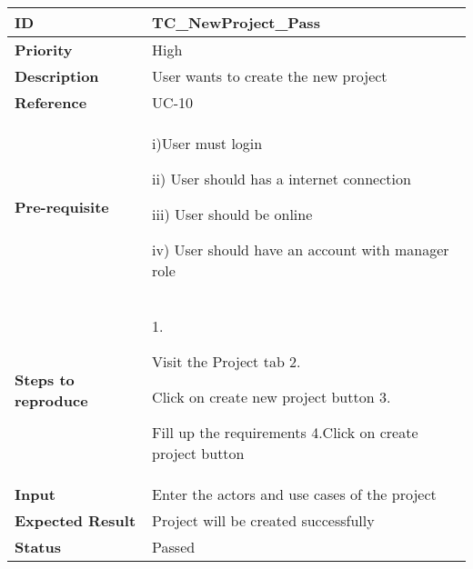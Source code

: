 \begin{center}
    \begin{tabularx}{\textwidth}{|l|X|}
        \hline
        \textbf{ID}                 & TC\_NewProject\_Pass                          \\
        \hline
        \textbf{Priority}           & High                                          \\
        \hline
        \textbf{Description}        & User wants to create the new project          \\
        \hline
        \textbf{Reference}          & UC-10                                         \\
        \hline
        \textbf{Pre-requisite}      & i)User must login

        ii) User should has a internet connection

        iii) User should be online

        iv) User should have an account with manager role                           \\
        \hline
        \textbf{Steps to reproduce} & 1.

        Visit the Project tab 2.

        Click on create new project button 3.

        Fill up the requirements 4.Click on create project button                   \\
        \hline
        \textbf{Input}              & Enter the actors and use cases of the project \\
        \hline
        \textbf{Expected Result}    & Project will be created successfully          \\
        \hline
        \textbf{Status}             & Passed                                        \\
        \hline
    \end{tabularx}
\end{center}
\vspace{5mm}



